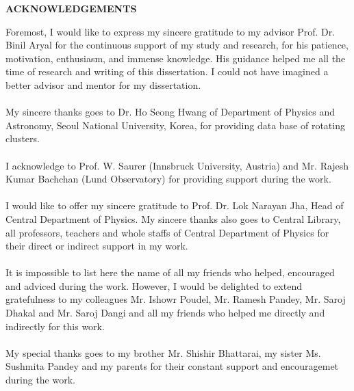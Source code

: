 \thispagestyle{plain}
\newpage
{}
\begin{center} \large\bf {ACKNOWLEDGEMENTS}
\end{center}
\vspace{1cm}  
Foremost, I would like to express my sincere gratitude to my advisor Prof. Dr. Binil Aryal for the continuous support of my study and research, for his patience, motivation, enthusiasm, and immense knowledge. His guidance helped me all the time of research and writing of this dissertation. I could not have imagined a better advisor and mentor for my dissertation.
\\
\\
My sincere thanks goes to  Dr.
Ho Seong Hwang of Department of Physics and Astronomy, Seoul
National University, Korea, for providing data base of rotating clusters.\\\\
I acknowledge to Prof. W. Saurer (Innsbruck University, Austria) and Mr. Rajesh Kumar Bachchan (Lund Observatory)
for providing support during the work.
\\\\
I would like to offer my sincere gratitude to Prof. Dr. Lok Narayan Jha,
Head of Central Department of Physics. My sincere
thanks also goes to Central Library, all professors, teachers and
whole staffs of Central Department of Physics for their direct or
indirect support in my work.
\\
\\
It is impossible to list here the name of all my friends who helped, encouraged and adviced during the work.
However, I would be delighted to extend gratefulness to my
colleagues Mr. Ishowr Poudel, Mr. Ramesh Pandey, Mr. Saroj Dhakal and Mr. Saroj Dangi and all my friends who helped me
directly and indirectly for this work.
\\
\\
My special thanks goes to my  brother Mr. Shishir Bhattarai, my sister Ms. Sushmita Pandey and  my parents
for their constant support and encouragemet during the work.
\\
\\
\vspace{0.001cm}\\

